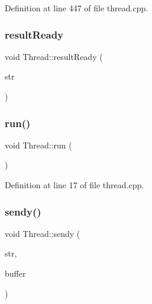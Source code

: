 Definition at line 447 of file thread.\+cpp.

\mbox{\label{class_thread_aa850562d414991f4b235d23623902ce6}} 
\subsubsection{\texorpdfstring{result\+Ready}{resultReady}}
{\footnotesize\ttfamily void Thread\+::result\+Ready (\begin{DoxyParamCaption}\item[{Q\+String}]{str }\end{DoxyParamCaption})\hspace{0.3cm}{\ttfamily [signal]}}

\mbox{\label{class_thread_ad9373d8d725c46717dfce3130018fe3a}} 
\subsubsection{\texorpdfstring{run()}{run()}}
{\footnotesize\ttfamily void Thread\+::run (\begin{DoxyParamCaption}{ }\end{DoxyParamCaption})\hspace{0.3cm}{\ttfamily [private]}}



Definition at line 17 of file thread.\+cpp.

\mbox{\label{class_thread_a4146abfb147f50ec1f12861a8d19bdbc}} 
\subsubsection{\texorpdfstring{sendy()}{sendy()}}
{\footnotesize\ttfamily void Thread\+::sendy (\begin{DoxyParamCaption}\item[{Q\+String}]{str,  }\item[{char $\ast$}]{buffer }\end{DoxyParamCaption})\hspace{0.3cm}{\ttfamily [private]}}

\mbox{\label{class_thread_a295966eb0f2a153e131c0cadb4602aaa}} 
